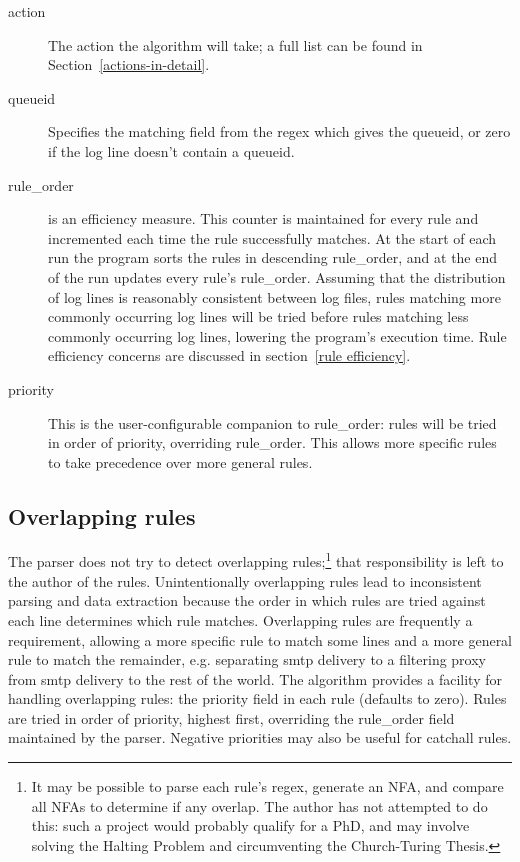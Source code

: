 \documentclass[a4paper,12pt,draft]{article}
\begin{document}
\begin{description}
    \item [action] The action the algorithm will take; a full list can be
        found in Section~\ref{actions-in-detail}.

    \item [queueid] Specifies the matching field from the regex which gives
        the queueid, or zero if the log line doesn't contain a queueid.

    \item [rule\_order] is an efficiency measure.  This counter is
        maintained for every rule and incremented each time the rule
        successfully matches.  At the start of each run the program sorts
        the rules in descending rule\_order, and at the end of the run
        updates every rule's rule\_order.  Assuming that the distribution
        of log lines is reasonably consistent between log files, rules
        matching more commonly occurring log lines will be tried before
        rules matching less commonly occurring log lines, lowering the
        program's execution time.  Rule efficiency concerns are discussed
        in section~\ref{rule efficiency}.

    \item [priority] This is the user-configurable companion to
        rule\_order: rules will be tried in order of priority, overriding
        rule\_order.  This allows more specific rules to take precedence
        over more general rules.

\end{description}


\subsection{Overlapping rules}

The parser does not try to detect overlapping rules;\footnote{It may be
possible to parse each rule's regex, generate an NFA, and compare all NFAs
to determine if any overlap.  The author has not attempted to do this: such
a project would probably qualify for a PhD, and may involve solving the
Halting Problem and circumventing the Church-Turing Thesis.} that
responsibility is left to the author of the rules.  Unintentionally
overlapping rules lead to inconsistent parsing and data extraction because
the order in which rules are tried against each line determines which rule
matches.  Overlapping rules are frequently a requirement, allowing a more
specific rule to match some lines and a more general rule to match the
remainder, e.g. separating smtp delivery to a filtering proxy from smtp
delivery to the rest of the world.  The algorithm provides a facility for
handling overlapping rules: the priority field in each rule (defaults to
zero).  Rules are tried in order of priority, highest first, overriding the
rule\_order field maintained by the parser.  Negative priorities may also
be useful for catchall rules.
\end{document}
